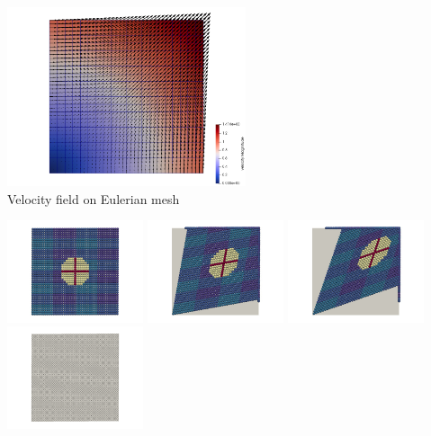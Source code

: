 \begin{center}
\includegraphics[width=7cm]{python_codes/fieldstone_89/results/pureshear/vel}\\
{\captionfont Velocity field on Eulerian mesh}
\end{center}

\begin{center}
\includegraphics[width=4cm]{python_codes/fieldstone_89/results/pureshear/paint0000}
\includegraphics[width=4cm]{python_codes/fieldstone_89/results/pureshear/paint0005}
\includegraphics[width=4cm]{python_codes/fieldstone_89/results/pureshear/paint0010}\\
\includegraphics[width=4cm]{python_codes/fieldstone_89/results/pureshear/old_dirs0000}

\end{center}
